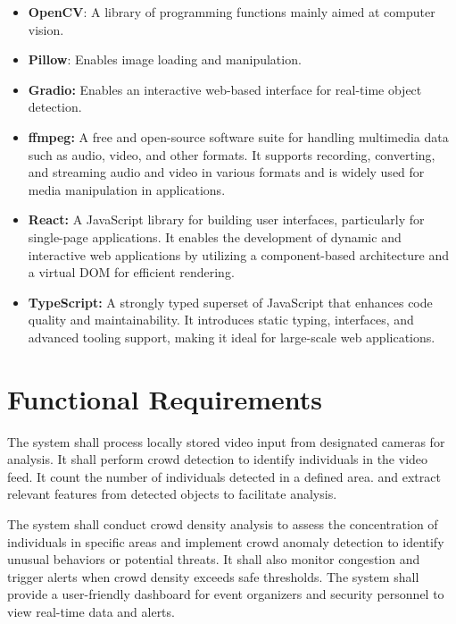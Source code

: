 \documentclass[11pt]{report}
\begin{document}
\begin{itemize}
        \item \textbf{OpenCV}: A library of programming functions mainly aimed at computer vision.
        
        \item \textbf{Pillow}: Enables image loading and manipulation.
         
        \item \textbf{Gradio:} Enables an interactive web-based interface for real-time object detection.

         \item \textbf{ffmpeg:} A free and open-source software suite for handling multimedia data such as audio, video, and other formats. It supports recording, converting, and streaming audio and video in various formats and is widely used for media manipulation in applications.    

         \item \textbf{React:} A JavaScript library for building user interfaces, particularly for single-page applications. It enables the development of dynamic and interactive web applications by utilizing a component-based architecture and a virtual DOM for efficient rendering.

        \item \textbf{TypeScript:} A strongly typed superset of JavaScript that enhances code quality and maintainability. It introduces static typing, interfaces, and advanced tooling support, making it ideal for large-scale web applications.
\end{itemize}

\section{Functional Requirements}
 The system shall process locally stored video input from designated cameras for analysis. It shall perform crowd detection to identify individuals in the video feed. It count the number of individuals detected in a defined area. and extract relevant features from detected objects to facilitate analysis. 
 
The system shall conduct crowd density analysis to assess the concentration of individuals in specific areas and implement crowd anomaly detection to identify unusual behaviors or potential threats. It shall also monitor congestion and trigger alerts when crowd density exceeds safe thresholds. The system shall provide a user-friendly dashboard for event organizers and security personnel to view real-time data and alerts.  
\end{document}
